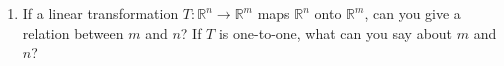 \documentclass[12pt]{article}
\newcommand{\reals}{\mathbb{R}}
\begin{document}
\begin{multicols*}{2}
\begin{enumerate}
		\item If a linear transformation $T:\reals^n\to \reals^m$ maps $\reals^n$ onto $\reals^m$, can you give a relation between $m$ and $n$? If $T$ is one-to-one, what can you say about $m$ and $n$?
		\vfill
	\end{enumerate}
\end{multicols*}
\end{document}
